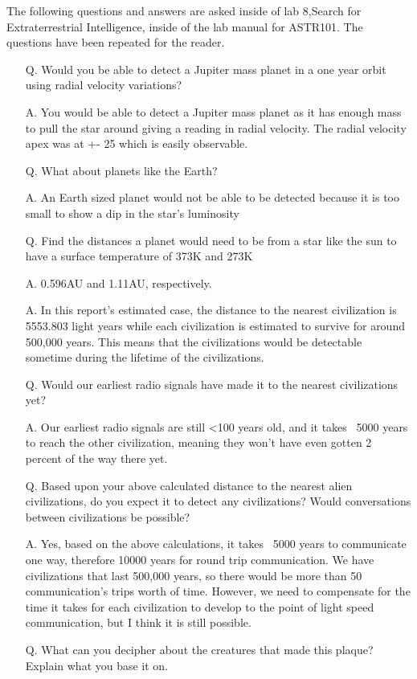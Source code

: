 \documentclass{article}
\begin{document}
The following questions and answers are asked inside of lab 8,Search for Extraterrestrial Intelligence, inside of the lab manual
for ASTR101. The questions have been repeated for the reader.

\begin{enumerate}
\item[Q.] Would you be able to detect a Jupiter mass planet in a one year orbit using radial velocity variations?
\item[A.] You would be able to detect a Jupiter mass planet as it has enough mass to pull the star around giving a reading in radial velocity.  The radial velocity apex was at +- 25 which is easily observable.
\item[Q.] What about planets like the Earth?
\item[A.] An Earth sized planet would not be able to be detected because it is too small to show a dip in the star's luminosity
\item[Q.] Find the distances a planet would need to be from a star like the sun to have a surface temperature of 373K and 273K
\item[A.] 0.596AU and 1.11AU, respectively.
\item[A.] In this report's estimated case, the distance to the nearest civilization is 5553.803 light years while each civilization is estimated to survive for around 500,000 years. This means that the civilizations would be detectable sometime during the lifetime of the civilizations. 
\item[Q.] Would our earliest radio signals have made it to the nearest civilizations yet?
\item[A.] Our earliest radio signals are still <100 years old, and it takes ~5000 years to reach the other civilization, meaning they won't have even gotten 2 percent of the way there yet.  
\item[Q.] Based upon your above calculated distance to the nearest alien civilizations, do you expect it to detect any civilizations?
Would conversations between civilizations be possible?
\item[A.] Yes, based on the above calculations, it takes ~5000 years to communicate one way, therefore 10000 years for round trip communication.  We have civilizations that last 500,000 years, so there would be more than 50 communication's trips worth of time.  However, we need to compensate for the time it takes for each civilization to develop to the point of light speed communication, but I think it is still possible.  
\item[Q.] What can you decipher about the creatures that made this plaque? Explain what you base it on.

\end{enumerate}
\end{document}
